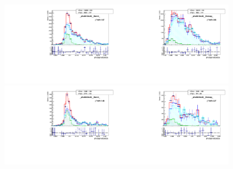 \begin{figure}[htb]
  \begin{center}
   \includegraphics[width=0.45\textwidth]{../figs/figs_v11/ELECTRON_WGamma/MCclosureWjetsPlusWg/c_TEMPL_SIHIH_UNblind__phoEt15to20__Barrel__RooFit_MCclosure.pdf}\includegraphics[width=0.45\textwidth]{../figs/figs_v11/ELECTRON_WGamma/MCclosureWjetsPlusWg/c_TEMPL_SIHIH_UNblind__phoEt15to20__Endcap__RooFit_MCclosure.pdf}\\
   \includegraphics[width=0.45\textwidth]{../figs/figs_v11/ELECTRON_WGamma/MCclosureWjetsPlusWg/c_TEMPL_SIHIH_UNblind__phoEt20to25__Barrel__RooFit_MCclosure.pdf}\includegraphics[width=0.45\textwidth]{../figs/figs_v11/ELECTRON_WGamma/MCclosureWjetsPlusWg/c_TEMPL_SIHIH_UNblind__phoEt20to25__Endcap__RooFit_MCclosure.pdf}\\

\end{center}
\end{figure}
